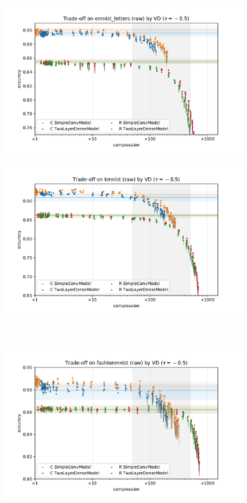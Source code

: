 \documentclass[a4paper,10pt]{article}
\begin{document}
\begin{figure}[b]
  \centering
  \begin{subfigure}[b]{0.5\textwidth}
    \centering
    \includegraphics[width=\linewidth]{figure__mnist-like__trade-off/legacy__VD__emnist_letters__raw__-0.5.pdf}
  \end{subfigure}%
  \begin{subfigure}[b]{0.5\textwidth}
    \centering
    \includegraphics[width=\linewidth]{figure__mnist-like__trade-off/legacy__VD__kmnist__raw__-0.5.pdf}
  \end{subfigure} \\%
  \begin{subfigure}[b]{0.5\textwidth}
    \centering
    \includegraphics[width=\linewidth]{figure__mnist-like__trade-off/legacy__VD__fashionmnist__raw__-0.5.pdf}

\end{subfigure}
\end{figure}
\end{document}
